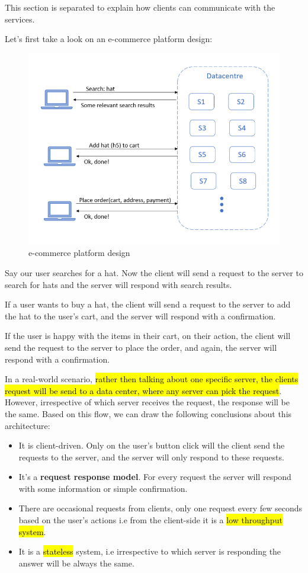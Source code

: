 This section is separated to explain how clients can communicate 
with the services. 

Let's first take a look on an e-commerce platform design:

\begin{figure}[h]
\centering
\includegraphics[width=0.8\linewidth]{figures/03_protocols_communication/e-commerce_platform.png}
\caption{e-commerce platform design}
\label{fig:ecommerce_platform_design}
\end{figure}



Say our user searches for a hat. Now the client will send a request 
to the server to search for hats and the server will respond with search 
results.

If a user wants to buy a hat, the client will send a request to the 
server to add the hat to the user's cart, and the server will respond 
with a confirmation.

If the user is happy with the items in their cart, on their action, 
the client will send the request to the server to place the order, 
and again, the server will respond with a confirmation.

In a real-world scenario, \hl{rather then talking about one specific server, 
the clients request will be send to a data center, where any server can 
pick the request}. However, irrespective of which server receives the request,
the response will be the same. Based on this flow, we can draw the following 
conclusions about this architecture:


\begin{itemize}
    \item It is client-driven. Only on the user's button click will 
    the client send the requests to the server, and the server will 
    only respond to these requests.
    \item It's a \textbf{request response model}. For every request the 
    server will respond with some information or simple confirmation. 
    \item There are occasional requests from clients, only one request 
    every few seconds based on the user's actions i.e from the client-side
    it is a \hl{low throughput system}. 
    \item It is a \hl{stateless} system, i.e irrespective to which server is 
    responding the answer will be always the same. 
\end{itemize}


